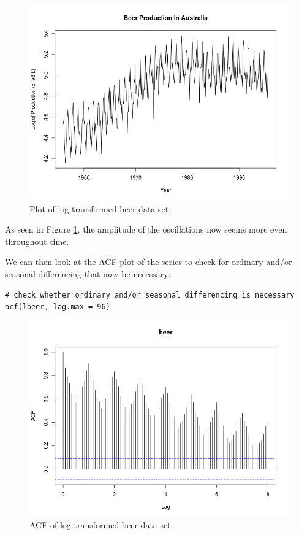 \documentclass[]{article}
\begin{document}
\begin{figure}[!ht]
\centering
\includegraphics[width=.8\textwidth]{lbeer.png}
\caption{Plot of log-transformed beer data set.}
\label{lbeer}
\end{figure}

As seen in Figure \ref{lbeer}, the amplitude of the oscillations now seems more even throughout time.

We can then look at the ACF plot of the series to check for ordinary and/or seasonal differencing that may be necessary:
\begin{Verbatim}[frame=single]
# check whether ordinary and/or seasonal differencing is necessary
acf(lbeer, lag.max = 96)
\end{Verbatim}

\begin{figure}[!ht]
\centering
\includegraphics[width=.8\textwidth]{lbeeracf.png}
\caption{ACF of log-transformed beer data set.}
\label{lbeeracf}
\end{figure}
\end{document}
